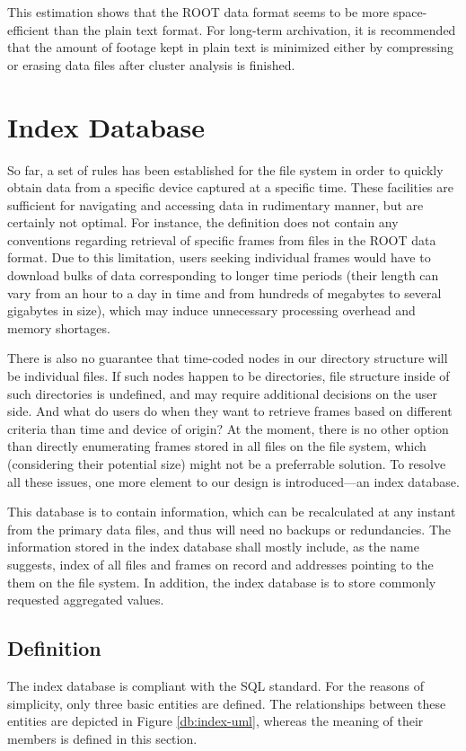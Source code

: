 This estimation shows that the ROOT data format seems to be more space-efficient than the plain text format. For long-term archivation, it is recommended that the amount of footage kept in plain text is minimized either by compressing or erasing data files after cluster analysis is finished.

\section{Index Database}
So far, a set of rules has been established for the file system in order to quickly obtain data from a specific device captured at a specific time. These facilities are sufficient for navigating and accessing data in rudimentary manner, but are certainly not optimal. For instance, the definition does not contain any conventions regarding retrieval of specific frames from files in the ROOT data format. Due to this limitation, users seeking individual frames would have to download bulks of data corresponding to longer time periods (their length can vary from an hour to a day in time and from hundreds of megabytes to several gigabytes in size), which may induce unnecessary processing overhead and memory shortages.

There is also no guarantee that time-coded nodes in our directory structure will be individual files. If such nodes happen to be directories, file structure inside of such directories is undefined, and may require additional decisions on the user side. And what do users do when they want to retrieve frames based on different criteria than time and device of origin? At the moment, there is no other option than directly enumerating frames stored in all files on the file system, which (considering their potential size) might not be a preferrable solution. To resolve all these issues, one more element to our design is introduced---an index database.

This database is to contain information, which can be recalculated at any instant from the primary data files, and thus will need no backups or redundancies. The information stored in the index database shall mostly include, as the name suggests, index of all files and frames on record and addresses pointing to the them on the file system. In addition, the index database is to store commonly requested aggregated values.

\subsection{Definition}
The index database is compliant with the SQL standard. For the reasons of simplicity, only three basic entities are defined. The relationships between these entities are depicted in Figure \ref{db:index-uml}, whereas the meaning of their members is defined in this section.

